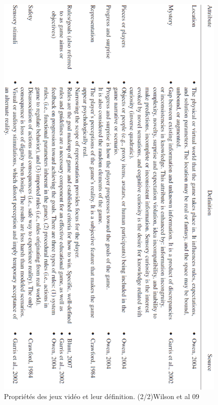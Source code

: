 \begin{figure}[htbp]
	\centering
	\includegraphics[width=\linewidth, height=\textheight ]{images/game_attributes_two}
	\caption{Propriétés des jeux vidéo et leur définition. (2/2)Wilson et al 09\cite{Wils09}}
	\label{game_attributes_two}
\end{figure}	

